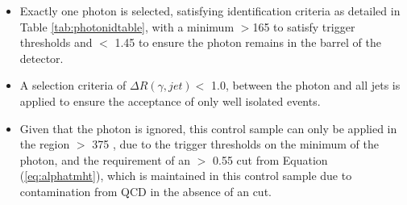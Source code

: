 \begin{itemize}
\begin{itemize}
\item Exactly one photon is selected, satisfying identification criteria as detailed in Table \ref{tab:photonidtable}, with a minimum \pt $> $165 \GeV to satisfy trigger thresholds and \abeta $<$ 1.45 to ensure the photon remains in the barrel of the detector.
\item A selection criteria of $\Delta R(\gamma,jet) <$ 1.0, between the photon and all jets is applied to ensure the acceptance of only well isolated \gpjets events. 
\item Given that the photon is ignored, this control sample can only be applied in the \theht region $>$ 375 \GeV, due to the trigger thresholds on the minimum \pt of the photon, and the \mht requirement of an \alphat $>$ 0.55 cut from Equation (\ref{eq:alphatmht}), which is maintained in this control sample due to contamination from QCD in the absence of an \alphat cut.
\end{itemize}



\end{itemize}
